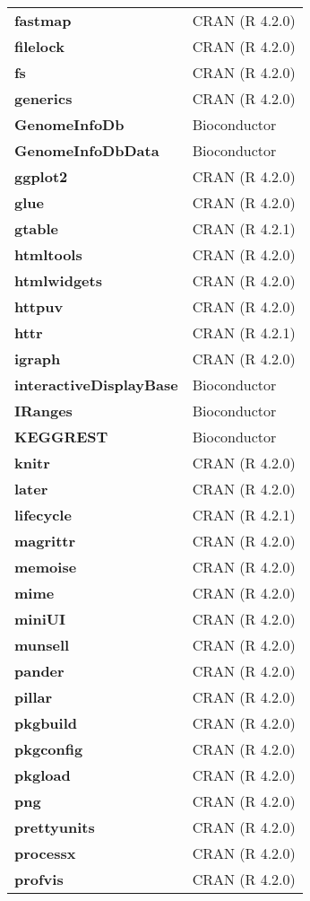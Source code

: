 \documentclass[
]{article}
\begin{document}
\begin{longtable}[]{@{}
  >{\centering\arraybackslash}p{}
  >{\centering\arraybackslash}p{}@{}}
\textbf{fastmap} & CRAN (R 4.2.0) \\
\textbf{filelock} & CRAN (R 4.2.0) \\
\textbf{fs} & CRAN (R 4.2.0) \\
\textbf{generics} & CRAN (R 4.2.0) \\
\textbf{GenomeInfoDb} & Bioconductor \\
\textbf{GenomeInfoDbData} & Bioconductor \\
\textbf{ggplot2} & CRAN (R 4.2.0) \\
\textbf{glue} & CRAN (R 4.2.0) \\
\textbf{gtable} & CRAN (R 4.2.1) \\
\textbf{htmltools} & CRAN (R 4.2.0) \\
\textbf{htmlwidgets} & CRAN (R 4.2.0) \\
\textbf{httpuv} & CRAN (R 4.2.0) \\
\textbf{httr} & CRAN (R 4.2.1) \\
\textbf{igraph} & CRAN (R 4.2.0) \\
\textbf{interactiveDisplayBase} & Bioconductor \\
\textbf{IRanges} & Bioconductor \\
\textbf{KEGGREST} & Bioconductor \\
\textbf{knitr} & CRAN (R 4.2.0) \\
\textbf{later} & CRAN (R 4.2.0) \\
\textbf{lifecycle} & CRAN (R 4.2.1) \\
\textbf{magrittr} & CRAN (R 4.2.0) \\
\textbf{memoise} & CRAN (R 4.2.0) \\
\textbf{mime} & CRAN (R 4.2.0) \\
\textbf{miniUI} & CRAN (R 4.2.0) \\
\textbf{munsell} & CRAN (R 4.2.0) \\
\textbf{pander} & CRAN (R 4.2.0) \\
\textbf{pillar} & CRAN (R 4.2.0) \\
\textbf{pkgbuild} & CRAN (R 4.2.0) \\
\textbf{pkgconfig} & CRAN (R 4.2.0) \\
\textbf{pkgload} & CRAN (R 4.2.0) \\
\textbf{png} & CRAN (R 4.2.0) \\
\textbf{prettyunits} & CRAN (R 4.2.0) \\
\textbf{processx} & CRAN (R 4.2.0) \\
\textbf{profvis} & CRAN (R 4.2.0) \\

\end{longtable}
\end{document}
